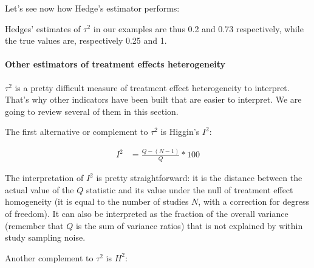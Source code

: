 \documentclass[
]{book}
\newenvironment{Shaded}{\begin{snugshade}}{\end{snugshade}}
\newcommand{\DecValTok}[1]{\textcolor[rgb]{0.00,0.00,0.81}{#1}}
\newcommand{\FloatTok}[1]{\textcolor[rgb]{0.00,0.00,0.81}{#1}}
\newcommand{\FunctionTok}[1]{\textcolor[rgb]{0.00,0.00,0.00}{#1}}
\newcommand{\NormalTok}[1]{#1}
\newcommand{\OtherTok}[1]{\textcolor[rgb]{0.56,0.35,0.01}{#1}}
\newcommand{\SpecialCharTok}[1]{\textcolor[rgb]{0.00,0.00,0.00}{#1}}
\theoremstyle{definition}
\theoremstyle{definition}
\theoremstyle{definition}
\theoremstyle{definition}
\theoremstyle{remark}
\begin{document}
Let's see now how Hedge's estimator performs:

\begin{Shaded}
\end{Shaded}

Hedges' estimates of \(\tau^2\) in our examples are thus 0.2 and 0.73 respectively, while the true values are, respectively 0.25 and 1.

\hypertarget{other-estimators-of-treatment-effects-heterogeneity}{%
\paragraph{Other estimators of treatment effects heterogeneity}\label{other-estimators-of-treatment-effects-heterogeneity}}

\(\tau^2\) is a pretty difficult measure of treatment effect heterogeneity to interpret.
That's why other indicators have been built that are easier to interpret.
We are going to review several of them in this section.

The first alternative or complement to \(\tau^2\) is Higgin's \(I^2\):

\begin{align*}
  I^2 & = \frac{Q-(N-1)}{Q}*100
\end{align*}

The interpretation of \(I^2\) is pretty straightforward: it is the distance between the actual value of the \(Q\) statistic and its value under the null of treatment effect homogeneity (it is equal to the number of studies \(N\), with a correction for degress of freedom).
It can also be interpreted as the fraction of the overall variance (remember that \(Q\) is the sum of variance ratios) that is not explained by within study sampling noise.

Another complement to \(\tau^2\) is \(H^2\):
\end{document}
